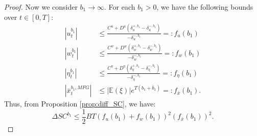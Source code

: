 \documentclass[11pt]{article}
\begin{document}
\begin{proof}
    Now we consider $b_1 \to \infty$. For each $b_1>0$, we have the following bounds over $t\in[0,T]$:
    \begin{equation*}
    \begin{split}
	    \left| u^{b_1}_t\right| &\leq \frac{C^u+D^u(\delta^{+,b_1}_u-\delta^{-,b_1}_u)}{-\delta^{-,b_1}_u}=:f_u(b_1) \\
		\left| w^{b_1}_t\right| &\leq \frac{C^w+D^w(\delta^{+,b_1}_w-\delta^{-,b_1}_w)}{-\delta^{-,b_1}_w}=:f_w(b_1) \\
		\left| \eta^{b_1}_t\right| &\leq \frac{C^{\eta}+D^{\eta}(\delta^{+,b_1}_{\eta}-\delta^{-,b_1}_{\eta})}{-\delta^{-,b_1}_{\eta}}=:f_{\eta}(b_1) \\
		\left| \bar{x}^{b_1,MFG}_t \right| &\leq \left| \mathbb{E}(\xi)\right| e^{T(b_1+\bar{b}_1)}=:f_{\bar{x}}(b_1).
    \end{split}
    \end{equation*}
    Thus, from Proposition \ref{prop:diff_SC}, we have:
    \begin{equation*}
	    \Delta SC^{b_1} \leq \frac{1}{2}BT(f_u(b_1)+f_w(b_1))^2 (f_{\bar{x}}(b_1))^2.
    \end{equation*}
    

\end{proof}
\end{document}
